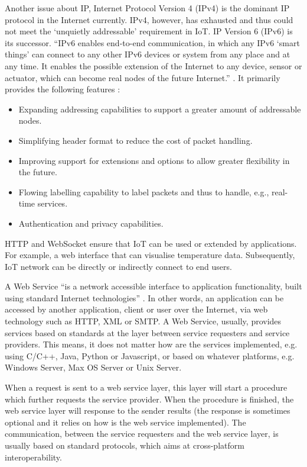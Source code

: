 Another issue about IP, Internet Protocol Version 4 (IPv4) is the dominant IP protocol in the Internet currently. IPv4, however, has exhausted \cite{smith2011free} and thus could not meet the `unquietly addressable' requirement in IoT. IP Version 6 (IPv6) is its successor. ``IPv6 enables end-to-end communication, in which any IPv6 `smart things' can connect to any other IPv6 devices or system from any place and at any time. It enables the possible extension of the Internet to any device, sensor or actuator, which can become real nodes of the future Internet.'' \cite{vermesan2011internet}. It primarily provides the following features \cite{deering1998internet}: 

\begin{itemize}
\setlength{\itemsep}{0pt}
\item Expanding addressing capabilities to support a greater amount of addressable nodes. 
\item Simplifying header format to reduce the cost of packet handling.
\item Improving support for extensions and options to allow greater flexibility in the future.
\item Flowing labelling capability to label packets and thus to handle, e.g., real-time services.
\item Authentication and privacy capabilities.
\end{itemize}

HTTP and WebSocket ensure that IoT can be used or extended by applications. For example, a web interface that can visualise temperature data. Subsequently, IoT network can be directly or indirectly connect to end users. 

A Web Service ``is a network accessible interface to application functionality, built using standard Internet technologies'' \cite{snell2009programming}. In other words, an application can be accessed by another application, client or user over the Internet, via web technology such as HTTP, XML or SMTP. A Web Service, usually, provides services based on standards at the layer between service requesters and service providers. This means, it does not matter how are the services implemented, e.g. using C/C++, Java, Python or Javascript, or based on whatever platforms, e.g. Windows Server, Max OS Server or Unix Server. 

When a request is sent to a web service layer, this layer will start a procedure which further requests the service provider. When the procedure is finished, the web service layer will response to the sender results (the response is sometimes optional and it relies on how is the web service implemented). The communication, between the service requesters and the web service layer, is usually based on standard protocols, which aims at cross-platform interoperability. 

